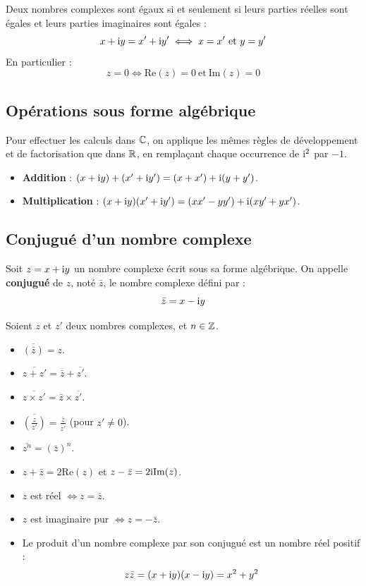 \begin{propriete}
Deux nombres complexes sont égaux si et seulement si leurs parties réelles sont égales et leurs parties imaginaires sont égales :
\[
x + \mathrm{i} y = x' + \mathrm{i} y' \iff x = x' \ \text{et} \ y = y'
\]
En particulier :
\[
z = 0 \iff \mathrm{Re}(z) = 0 \ \text{et} \ \mathrm{Im}(z) = 0
\]
\end{propriete}

\subsection{Opérations sous forme algébrique}
Pour effectuer les calculs dans $\mathbb{C}$, on applique les mêmes règles de développement et de factorisation que dans $\mathbb{R}$, en remplaçant chaque occurrence de $\mathrm{i}^2$ par $-1$.
\begin{itemize}
    \item \textbf{Addition} : $(x + \mathrm{i} y) + (x' + \mathrm{i} y') = (x+x') + \mathrm{i} (y+y')$.
    \item \textbf{Multiplication} : $(x + \mathrm{i} y)(x' + \mathrm{i} y') = (xx' - yy') + \mathrm{i} (xy' + yx')$.
\end{itemize}

\subsection{Conjugué d'un nombre complexe}

\begin{definition}[Conjugué]
Soit $z = x + \mathrm{i} y$ un nombre complexe écrit sous sa forme algébrique.
On appelle \textbf{conjugué} de $z$, noté $\bar{z}$, le nombre complexe défini par :
\[
\bar{z} = x - \mathrm{i} y
\]
\end{definition}

\begin{propriete}
Soient $z$ et $z'$ deux nombres complexes, et $n \in \mathbb{Z}$.
\begin{itemize}
    \item $\overline{(\bar{z})} = z$.
    \item $\overline{z + z'} = \bar{z} + \overline{z'}$.
    \item $\overline{z \times z'} = \bar{z} \times \overline{z'}$.
    \item $\overline{\left(\frac{z}{z'}\right)} = \frac{\bar{z}}{\overline{z'}}$ \quad (pour $z' \ne 0$).
    \item $\overline{z^n} = (\bar{z})^n$.
    \item $z + \bar{z} = 2\mathrm{Re}(z)$ \quad et \quad $z - \bar{z} = 2\mathrm{i}\mathrm{Im}(z)$.
    \item $z$ est réel $\iff z = \bar{z}$.
    \item $z$ est imaginaire pur $\iff z = -\bar{z}$.
    \item Le produit d'un nombre complexe par son conjugué est un nombre réel positif :
    \[
    z \bar{z} = (x + \mathrm{i} y)(x - \mathrm{i} y) = x^2 + y^2
    \]
\end{itemize}
\end{propriete}


